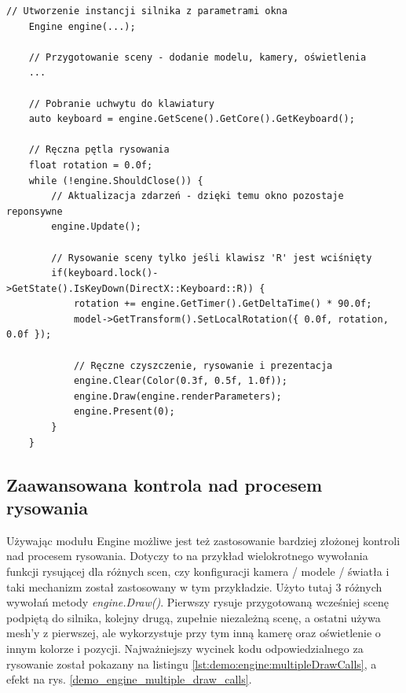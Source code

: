 \begin{lstlisting}[caption={Kod przykładowego programu manualnej kontroli przepływu działania programu w module silnika.}, label={lst:demo:engine:manualDrawingLoop}]
	// Utworzenie instancji silnika z parametrami okna
	Engine engine(...);
	
	// Przygotowanie sceny - dodanie modelu, kamery, oświetlenia
	...
	
	// Pobranie uchwytu do klawiatury
	auto keyboard = engine.GetScene().GetCore().GetKeyboard();
	
	// Ręczna pętla rysowania
	float rotation = 0.0f;
	while (!engine.ShouldClose()) {
		// Aktualizacja zdarzeń - dzięki temu okno pozostaje reponsywne
		engine.Update();
		
		// Rysowanie sceny tylko jeśli klawisz 'R' jest wciśnięty
		if(keyboard.lock()->GetState().IsKeyDown(DirectX::Keyboard::R)) {
			rotation += engine.GetTimer().GetDeltaTime() * 90.0f;
			model->GetTransform().SetLocalRotation({ 0.0f, rotation, 0.0f });
			
			// Ręczne czyszczenie, rysowanie i prezentacja
			engine.Clear(Color(0.3f, 0.5f, 1.0f));
			engine.Draw(engine.renderParameters);
			engine.Present(0);
		}
	}
\end{lstlisting}

\subsection{Zaawansowana kontrola nad procesem rysowania}
Używając modułu Engine możliwe jest też zastosowanie bardziej złożonej kontroli nad procesem rysowania. Dotyczy to na przykład wielokrotnego wywołania funkcji rysującej dla różnych scen, czy konfiguracji kamera / modele / światła i taki mechanizm został zastosowany w tym przykładzie. Użyto tutaj 3 różnych wywołań metody \textit{engine.Draw()}. Pierwszy rysuje przygotowaną wcześniej scenę podpiętą do silnika, kolejny drugą, zupełnie niezależną scenę, a ostatni używa mesh'y z pierwszej, ale wykorzystuje przy tym inną kamerę oraz oświetlenie o innym kolorze i pozycji. Najważniejszy wycinek kodu odpowiedzialnego za rysowanie został pokazany na listingu \ref{lst:demo:engine:multipleDrawCalls}, a efekt na rys.  \ref{demo_engine_multiple_draw_calls}.

